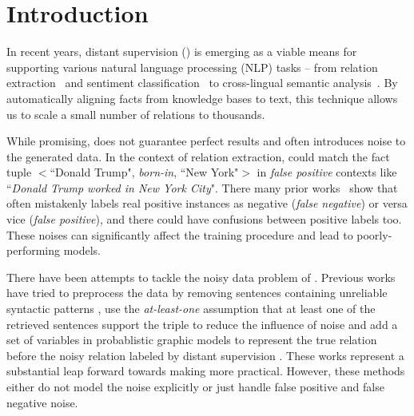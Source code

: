 \section{Introduction}

In recent years, distant supervision (\DS) is emerging as a viable means for supporting various natural language
processing (NLP) tasks -- from relation extraction~\cite{mintz2009distant} and sentiment classification~\cite{go2009twitter} to cross-lingual semantic
analysis~\cite{fang2016learning}. By automatically aligning
facts from knowledge bases to text, this technique allows us to scale a small number of relations to thousands.



While promising, \DS does not guarantee perfect results and often introduces noise to the
generated data. In the context of relation extraction, \DS could match the fact tuple $<$``Donald Trump",
\emph{born-in}, ``New York"$>$  in \emph{false positive} contexts like ``\emph{Donald Trump worked in New York City}".
There many prior works~\cite{} show that \DS often mistakenly labels real positive instances as negative (\emph{false negative}) or
versa vice (\emph{false positive}), and there could have confusions between positive labels too. These noises can
significantly affect the training
procedure and lead to poorly-performing models.

There have been attempts to tackle the noisy data problem of \DS. Previous works have tried to preprocess the data by removing sentences containing unreliable syntactic patterns \cite{takamatsu2012reducing}, use the \emph{at-least-one} assumption that at least one of the retrieved sentences support the triple to reduce the influence of noise \cite{riedel2010modeling} and add a set of variables in probablistic graphic models to represent the true relation before the noisy relation labeled by distant supervision \cite{hoffmann2011knowledge,surdeanu2012multi}. These works represent a substantial leap forward towards making \DS more practical. However, these methods either do not model the noise explicitly or just handle false positive and false negative noise.

